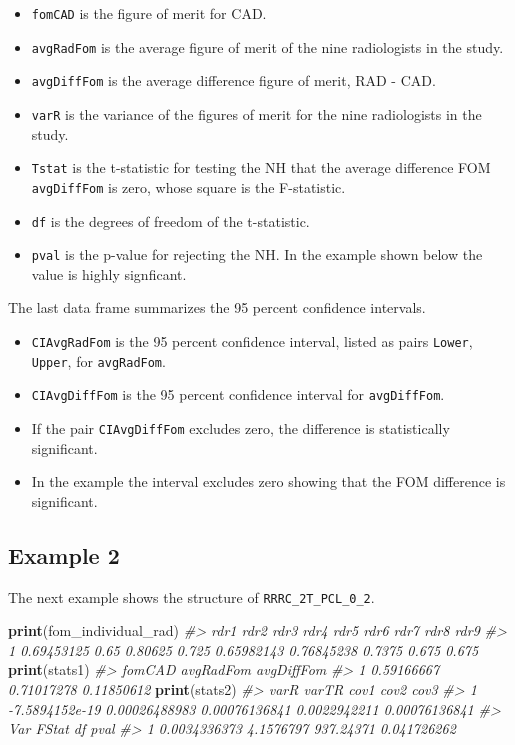 \documentclass[
]{book}
\newenvironment{Shaded}{\begin{snugshade}}{\end{snugshade}}
\newcommand{\CommentTok}[1]{\textcolor[rgb]{0.56,0.35,0.01}{\textit{#1}}}
\newcommand{\KeywordTok}[1]{\textcolor[rgb]{0.13,0.29,0.53}{\textbf{#1}}}
\newcommand{\NormalTok}[1]{#1}
\providecommand{\tightlist}{%
  \setlength{\itemsep}{0pt}\setlength{\parskip}{0pt}}
\begin{document}
\begin{itemize}
\tightlist
\item
  \texttt{fomCAD} is the figure of merit for CAD.
\item
  \texttt{avgRadFom} is the average figure of merit of the nine radiologists in the study.
\item
  \texttt{avgDiffFom} is the average difference figure of merit, RAD - CAD.
\item
  \texttt{varR} is the variance of the figures of merit for the nine radiologists in the study.
\item
  \texttt{Tstat} is the t-statistic for testing the NH that the average difference FOM \texttt{avgDiffFom} is zero, whose square is the F-statistic.
\item
  \texttt{df} is the degrees of freedom of the t-statistic.
\item
  \texttt{pval} is the p-value for rejecting the NH. In the example shown below the value is highly signficant.
\end{itemize}

The last data frame summarizes the 95 percent confidence intervals.

\begin{itemize}
\tightlist
\item
  \texttt{CIAvgRadFom} is the 95 percent confidence interval, listed as pairs \texttt{Lower}, \texttt{Upper}, for \texttt{avgRadFom}.
\item
  \texttt{CIAvgDiffFom} is the 95 percent confidence interval for \texttt{avgDiffFom}.
\item
  If the pair \texttt{CIAvgDiffFom} excludes zero, the difference is statistically significant.
\item
  In the example the interval excludes zero showing that the FOM difference is significant.
\end{itemize}

\hypertarget{example-2-1}{%
\subsection{Example 2}\label{example-2-1}}

The next example shows the structure of \texttt{RRRC\_2T\_PCL\_0\_2}.

\begin{Shaded}
\begin{Highlighting}[]

\KeywordTok{print}\NormalTok{(fom_individual_rad)}
\CommentTok{#>         rdr1 rdr2    rdr3  rdr4       rdr5       rdr6   rdr7  rdr8  rdr9}
\CommentTok{#> 1 0.69453125 0.65 0.80625 0.725 0.65982143 0.76845238 0.7375 0.675 0.675}
\KeywordTok{print}\NormalTok{(stats1)}
\CommentTok{#>       fomCAD  avgRadFom avgDiffFom}
\CommentTok{#> 1 0.59166667 0.71017278 0.11850612}
\KeywordTok{print}\NormalTok{(stats2)}
\CommentTok{#>             varR         varTR          cov1         cov2          cov3}
\CommentTok{#> 1 -7.5894152e-19 0.00026488983 0.00076136841 0.0022942211 0.00076136841}
\CommentTok{#>            Var     FStat        df        pval}
\CommentTok{#> 1 0.0034336373 4.1576797 937.24371 0.041726262}
\end{Highlighting}
\end{Shaded}
\end{document}
